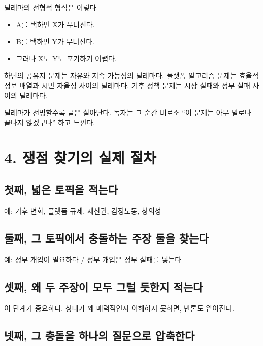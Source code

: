 딜레마의 전형적 형식은 이렇다.

\begin{itemize}
\tightlist
\item
  A를 택하면 X가 무너진다.
\item
  B를 택하면 Y가 무너진다.
\item
  그러나 X도 Y도 포기하기 어렵다.
\end{itemize}

하딘의 공유지 문제는 자유와 지속 가능성의 딜레마다. 플랫폼 알고리즘 문제는 효율적 정보 배열과 시민 자율성 사이의 딜레마다. 기후 정책 문제는 시장 실패와 정부 실패 사이의 딜레마다.

딜레마가 선명할수록 글은 살아난다. 독자는 그 순간 비로소 ``이 문제는 아무 말로나 끝나지 않겠구나'' 하고 느낀다.

\section{4. 쟁점 찾기의 실제 절차}\label{4-uxc7c1uxc810-uxcc3euxae30uxc758-uxc2e4uxc81c-uxc808uxcc28}

\subsection{첫째, 넓은 토픽을 적는다}\label{uxccabuxc9f8-uxb113uxc740-uxd1a0uxd53duxc744-uxc801uxb294uxb2e4}

예: 기후 변화, 플랫폼 규제, 재산권, 감정노동, 창의성

\subsection{둘째, 그 토픽에서 충돌하는 주장 둘을 찾는다}\label{uxb458uxc9f8-uxadf8-uxd1a0uxd53duxc5d0uxc11c-uxcda9uxb3ccuxd558uxb294-uxc8fcuxc7a5-uxb458uxc744-uxcc3euxb294uxb2e4}

예: 정부 개입이 필요하다 / 정부 개입은 정부 실패를 낳는다

\subsection{셋째, 왜 두 주장이 모두 그럴 듯한지 적는다}\label{uxc14buxc9f8-uxc65c-uxb450-uxc8fcuxc7a5uxc774-uxbaa8uxb450-uxadf8uxb7f4-uxb4efuxd55cuxc9c0-uxc801uxb294uxb2e4}

이 단계가 중요하다. 상대가 왜 매력적인지 이해하지 못하면, 반론도 얕아진다.

\subsection{넷째, 그 충돌을 하나의 질문으로 압축한다}\label{uxb137uxc9f8-uxadf8-uxcda9uxb3ccuxc744-uxd558uxb098uxc758-uxc9c8uxbb38uxc73cuxb85c-uxc555uxcd95uxd55cuxb2e4}

